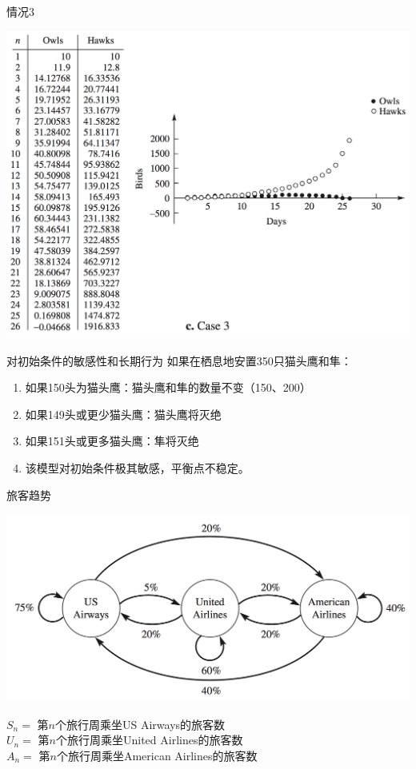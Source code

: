 \documentclass[UTF8]{ctexbeamer}
\begin{document}
\begin{frame}{情况3}
  \begin{center}
    \includegraphics[height=.9\textheight{}]{owl-3.png}
  \end{center}  
\end{frame}

\begin{frame}{对初始条件的敏感性和长期行为}
  如果在栖息地安置350只猫头鹰和隼：

  \begin{enumerate}
  \item<1-> 如果150头为猫头鹰：猫头鹰和隼的数量不变（150、200）
  \item<2-> 如果149头或更少猫头鹰：猫头鹰将灭绝
  \item<3-> 如果151头或更多猫头鹰：隼将灭绝
  \item<4-> 该模型对初始条件极其敏感，平衡点不稳定。
  \end{enumerate}

\end{frame}

\begin{frame}{旅客趋势}
  \begin{center}
    \includegraphics[width=.6\textwidth{}]{party.png}
  \end{center}  
  
  \begin{definition}
    $S_n = $ 第$n$个旅行周乘坐US Airways的旅客数\\
    $U_n = $ 第$n$个旅行周乘坐United Airlines的旅客数\\
    $A_n = $ 第$n$个旅行周乘坐American Airlines的旅客数
  \end{definition}
  
\end{frame}
\end{document}
